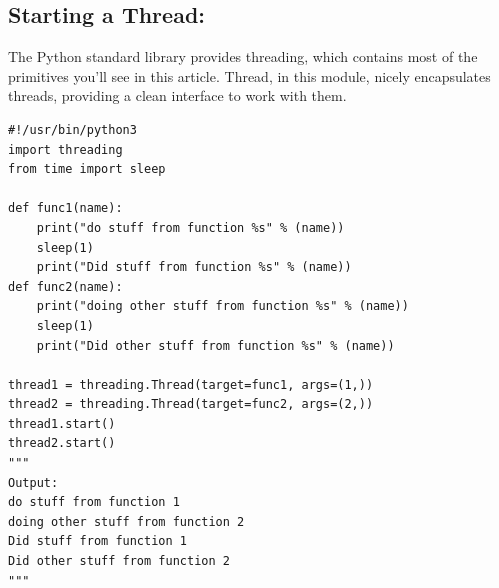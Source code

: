 \documentclass{report}
\begin{document}
    \subsection{Starting a Thread:}
    \bigbreak \noindent 
    The Python standard library provides threading, which contains most of the primitives you’ll see in this article. Thread, in this module, nicely encapsulates threads, providing a clean interface to work with them.
    \bigbreak \noindent 
    \begin{mdframed}
        \begin{verbatim}
#!/usr/bin/python3
import threading
from time import sleep

def func1(name):
    print("do stuff from function %s" % (name))
    sleep(1)
    print("Did stuff from function %s" % (name))
def func2(name):
    print("doing other stuff from function %s" % (name))
    sleep(1)
    print("Did other stuff from function %s" % (name))

thread1 = threading.Thread(target=func1, args=(1,))
thread2 = threading.Thread(target=func2, args=(2,)) 
thread1.start()
thread2.start()
"""
Output:
do stuff from function 1
doing other stuff from function 2
Did stuff from function 1
Did other stuff from function 2
"""
        \end{verbatim}
    \end{mdframed}

    \bigbreak \noindent \bigbreak \noindent 
\end{document}
